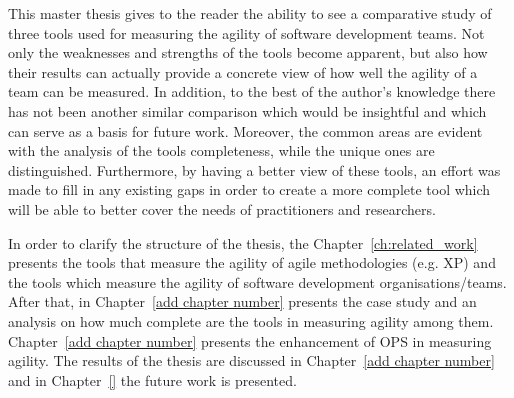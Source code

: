 This master thesis gives to the reader the ability to see a comparative study of three tools used for measuring the agility of software development teams. Not only the weaknesses and strengths of the tools become apparent, but also how their results can actually provide a concrete view of how well the agility of a team can be measured. In addition, to the best of the author's knowledge there has not been another similar comparison which would be insightful and which can serve as a basis for future work. Moreover, the common areas are evident with the analysis of the tools completeness, while the unique ones are distinguished. Furthermore, by having a better view of these tools, an effort was made to fill in any existing gaps in order to create a more complete tool which will be able to better cover the needs of practitioners and researchers.

In order to clarify the structure of the thesis, the Chapter~\ref{ch:related_work} presents the tools that measure the agility of agile methodologies (e.g. XP) and the tools which measure the agility of software development organisations/teams. After that, in Chapter~\ref{add chapter number} presents the case study and an analysis on how much complete are the tools in measuring agility among them. Chapter~\ref{add chapter number} presents the enhancement of OPS in measuring agility. The results of the thesis are discussed in Chapter~\ref{add chapter number} and in Chapter~\ref{} the future work is presented. 



